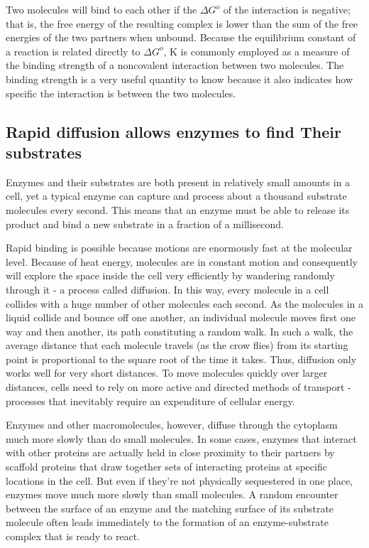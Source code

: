 Two molecules will bind to each other if the $\Delta G^{o}$ of the interaction is
negative; that is, the free energy of the resulting complex is lower than
the sum of the free energies of the two partners when unbound. Because
the equilibrium constant of a reaction is related directly to $\Delta G^{o}$, K is
commonly employed as a measure of the binding strength of a noncovalent
interaction between two molecules. The binding strength is a very useful
quantity to know because it also indicates how specific the interaction is
between the two molecules.


\subsection{Rapid diffusion allows enzymes to find Their substrates}

Enzymes and their substrates are both present in relatively small amounts
in a cell, yet a typical enzyme can capture and process about a thousand
substrate molecules every second. This means that an enzyme must be
able to release its product and bind a new substrate in a fraction of a
millisecond.

Rapid binding is possible because motions are enormously fast at the
molecular level. Because of heat energy, molecules are in constant
motion and consequently will explore the space inside the cell very efficiently
by wandering randomly through it - a process called diffusion. In
this way, every molecule in a cell collides with a huge number of other
molecules each second. As the molecules in a liquid collide and bounce
off one another, an individual molecule moves first one way and then
another, its path constituting a random walk. In such a walk,
the average distance that each molecule travels (as the crow flies) from
its starting point is proportional to the square root of the time it takes.
Thus, diffusion only works well for very short distances. To move molecules
quickly over larger distances, cells need to rely on more active
and directed methods of transport - processes that inevitably require an
expenditure of cellular energy.

Enzymes and other macromolecules, however, diffuse through the cytoplasm
much more slowly than do small molecules. In some cases, enzymes
that interact with other proteins are actually held in close proximity to
their partners by scaffold proteins that draw together sets of interacting
proteins at specific locations in the cell. But even if they’re not physically
sequestered in one place, enzymes move much more slowly than
small molecules. A random encounter between the surface of an enzyme and the matching
surface of its substrate molecule often leads immediately to the formation of
an enzyme-substrate complex that is ready to react.

